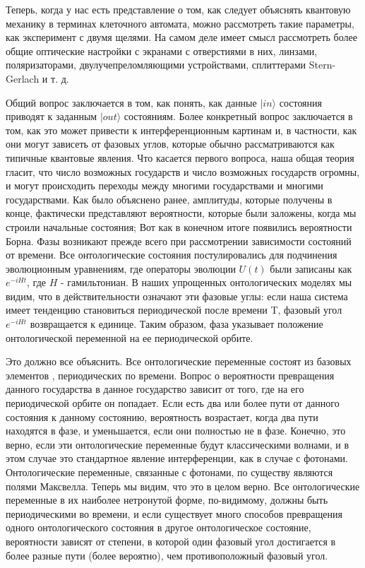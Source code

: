 \documentclass[main.tex]{subfiles}
\begin{document}
Теперь, когда у нас есть представление о том, как следует объяснять квантовую механику в терминах клеточного автомата, можно рассмотреть такие параметры, как эксперимент с двумя щелями. На самом деле имеет смысл рассмотреть более общие оптические настройки с экранами с отверстиями в них, линзами, поляризаторами, двулучепреломляющими устройствами, сплиттерами Stern-Gerlach и т. д.

Общий вопрос заключается в том, как понять, как данные $| in\rangle$ состояния приводят к заданным $| out\rangle$ состояниям. Более конкретный вопрос заключается в том, как это может привести к интерференционным картинам и, в частности, как они могут зависеть от фазовых углов, которые обычно рассматриваются как типичные квантовые явления.
Что касается первого вопроса, наша общая теория гласит, что число возможных государств и число возможных государств огромны, и могут происходить переходы между многими государствами и многими государствами. Как было объяснено ранее, амплитуды, которые получены в конце, фактически представляют вероятности, которые были заложены, когда мы строили начальные состояния; Вот как в конечном итоге появились вероятности Борна.
Фазы возникают прежде всего при рассмотрении зависимости состояний от времени. Все онтологические состояния постулировались для подчинения эволюционным уравнениям, где операторы эволюции $U(t)$ были записаны как $e^{-iHt}$, где $H$ - гамильтониан. В наших упрощенных онтологических моделях мы видим, что в действительности означают эти фазовые углы: если наша система имеет тенденцию становиться периодической после времени T, фазовый угол $e^{-iHt}$ возвращается к единице. Таким образом, фаза указывает положение онтологической переменной на ее периодической орбите.

Это должно все объяснить. Все онтологические переменные состоят из базовых элементов , периодических по времени. Вопрос о вероятности превращения данного государства в данное государство зависит от того, где на его периодической орбите он попадает. Если есть два или более пути от данного состояния к данному состоянию, вероятность возрастает, когда два пути находятся в фазе, и уменьшается, если они полностью не в фазе. Конечно, это верно, если эти онтологические переменные будут классическими волнами, и в этом случае это стандартное явление интерференции, как в случае с фотонами. Онтологические переменные, связанные с фотонами, по существу являются полями Максвелла. Теперь мы видим, что это в целом верно. Все онтологические переменные в их наиболее нетронутой форме, по-видимому, должны быть периодическими во времени, и если существует много способов превращения одного онтологического состояния в другое онтологическое состояние, вероятности зависят от степени, в которой один фазовый угол достигается в более разные пути (более вероятно), чем противоположный фазовый угол.
\end{document}
